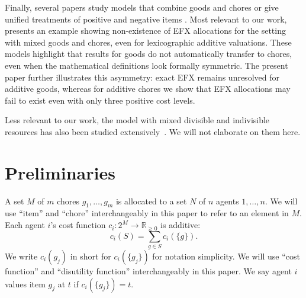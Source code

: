 \documentclass{article}
\theoremstyle{definition}
\begin{document}

Finally, several papers study models that combine goods and chores or give
unified treatments of positive and negative items
\citep{hosseini2023fairly,gafni2023unified,aziz2025fair,li2025truthfully,zhou2024complete}. 
Most relevant to our work, \citet{hosseini2023fairly} presents an example showing non-existence of EFX allocations for the setting with mixed goods and chores, even for lexicographic additive valuations. 
These models highlight that results for
goods do not automatically transfer to chores, even when the mathematical
definitions look formally symmetric.  The present paper further illustrates this
asymmetry: exact EFX remains unresolved for additive goods, whereas for additive
chores we show that EFX allocations may fail to exist even with only three
positive cost levels.

Less relevant to our work, the model with mixed divisible and indivisible resources has also been studied extensively~\citep{bei2021fair,liu2024mixed,aziz2025fair}.
We will not elaborate on them here.

\section{Preliminaries}
A set $M$ of $m$ chores $g_1,\ldots,g_m$ is allocated to a set $N$ of $n$ agents $1,\ldots,n$.
We will use ``item'' and ``chore'' interchangeably in this paper to refer to an element in $M$.
Each agent $i$'s cost function $c_i:2^M\to\mathbb{R}_{\geq0}$ is additive:
$$c_i(S)=\sum_{g\in S}c_i(\{g\}).$$
We write $c_i(g_j)$ in short for $c_i(\{g_j\})$ for notation simplicity.
We will use ``cost function'' and ``disutility function'' interchangeably in this paper.
We say agent $i$ values item $g_j$ at $t$ if $c_i(\{g_j\})=t$.
\end{document}
